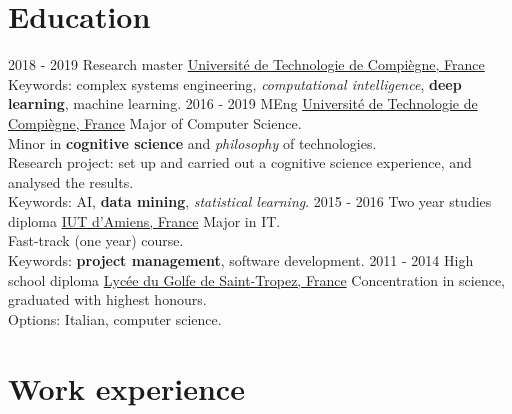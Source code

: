 \documentclass[a4paper]{twentysecondcv} %
\begin{document}
\makeprofile %


\section{Education}

\begin{twenty} %
	\twentyitem
    	{2018 - 2019}
        {}
        {Research master}
        {\href{https://www.utc.fr/}{Université de Technologie de Compiègne, France}}
        {}
        {Keywords: complex systems engineering, \textit{computational intelligence}, \textbf{deep learning}, machine learning.}
	\twentyitem
    	{2016 - 2019}
        {}
        {MEng}
        {\href{https://www.utc.fr/}{Université de Technologie de Compiègne, France}}
        {}
        {Major of Computer Science.\\Minor in \textbf{cognitive science} and \textit{philosophy} of technologies.\\Research project: set up and carried out a cognitive science experience, and analysed the results.\\Keywords: AI, \textbf{data mining}, \textit{statistical learning}.}
	\twentyitem
    	{2015 - 2016}
        {}
        {Two year studies diploma}
        {\href{http://www.iut-amiens.fr/}{IUT d'Amiens, France}}
        {}
        {Major in IT.\\Fast-track (one year) course.\\Keywords: \textbf{project management}, software development.}
	\twentyitem
    	{2011 - 2014}
		{}
        {High school diploma}
        {\href{http://www.lyc-du-golfe-de-saint-tropez.ac-nice.fr/}{Lycée du Golfe de Saint-Tropez, France}}
        {}
        {Concentration in science, graduated with highest honours.\\Options: Italian, computer science.}
\end{twenty}


\section{Work experience}
\end{document}
